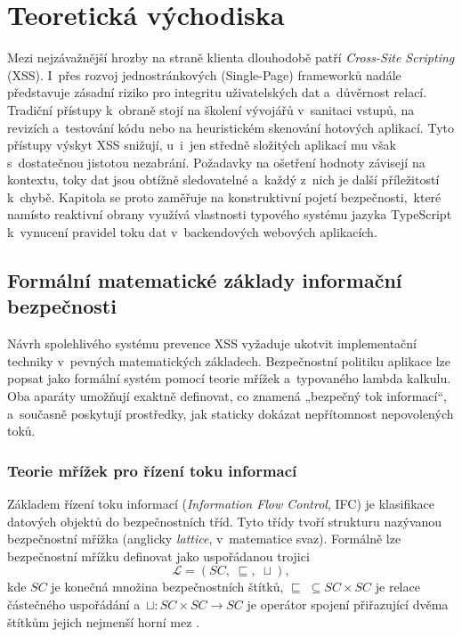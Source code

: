 \chapter{Teoretická východiska}

Mezi nejzávažnější hrozby na straně klienta dlouhodobě patří \emph{Cross-Site Scripting} (XSS). I~přes rozvoj jednostránkových (Single-Page) frameworků nadále představuje zásadní riziko pro integritu uživatelských dat a~důvěrnost relací. Tradiční přístupy k~obraně stojí na školení vývojářů v~sanitaci vstupů, na revizích a~testování kódu nebo na heuristickém skenování hotových aplikací. Tyto přístupy výskyt XSS snižují, u~i~jen středně složitých aplikací mu však s~dostatečnou jistotou nezabrání. Požadavky na ošetření hodnoty závisejí na kontextu, toky dat jsou obtížně sledovatelné a~každý z~nich je další příležitostí k~chybě. Kapitola se proto zaměřuje na konstruktivní pojetí bezpečnosti,~které namísto reaktivní obrany využívá vlastnosti typového systému jazyka TypeScript k~vynucení pravidel toku dat v~backendových webových aplikacích.

\section{Formální matematické základy informační bezpečnosti}

Návrh spolehlivého systému prevence XSS vyžaduje ukotvit implementační techniky v~pevných matematických základech. Bezpečnostní politiku aplikace lze popsat jako formální systém pomocí teorie mřížek a~typovaného lambda kalkulu. Oba aparáty umožňují exaktně definovat, co znamená „bezpečný tok informací“, a~současně poskytují prostředky, jak staticky dokázat nepřítomnost nepovolených toků.

\subsection{Teorie mřížek pro řízení toku informací}

Základem řízení toku informací (\emph{Information Flow Control}, IFC) je klasifikace datových objektů do bezpečnostních tříd. Tyto třídy tvoří strukturu nazývanou bezpečnostní mřížka (anglicky \emph{lattice}, v~matematice svaz). Formálně lze bezpečnostní mřížku definovat jako uspořádanou trojici
\begin{equation}
    \mathcal{L} = (SC,\; \sqsubseteq,\; \sqcup),
    \label{eq:lattice}
\end{equation}
kde $SC$ je konečná množina bezpečnostních štítků, $\sqsubseteq\; \subseteq SC \times SC$ je relace částečného uspořádání a~$\sqcup : SC \times SC \to SC$ je operátor spojení přiřazující dvěma štítkům jejich nejmenší horní mez \parencite{denning1976lattice}.


